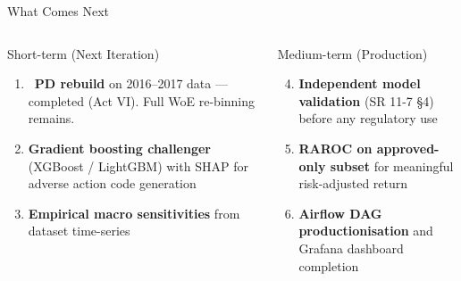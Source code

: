\documentclass[aspectratio=169,11pt]{beamer}
\newcommand{\yes}{\textcolor{okgreen}{\checkmark}}
\newcommand{\B}[1]{\textbf{#1}}
\begin{document}
\begin{frame}[shrink=5]{What Comes Next}
  \begin{columns}[T]
      \begin{exampleblock}{Short-term (Next Iteration)}\small
        \begin{enumerate}
          \item \yes\ \B{PD rebuild} on 2016--2017 data --- completed (Act VI). Full WoE re-binning remains.
          \item \B{Gradient boosting challenger} (XGBoost / LightGBM) with SHAP for adverse action code generation
          \item \B{Empirical macro sensitivities} from dataset time-series
        \end{enumerate}
      \end{exampleblock}

      \begin{exampleblock}{Medium-term (Production)}\small
        \begin{enumerate}
          \setcounter{enumi}{3}
          \item \B{Independent model validation} (SR 11-7 \S4) before any regulatory use
          \item \B{RAROC on approved-only subset} for meaningful risk-adjusted return
          \item \B{Airflow DAG productionisation} and Grafana dashboard completion
        \end{enumerate}
      \end{exampleblock}
  \end{columns}
\end{frame}
\end{document}
